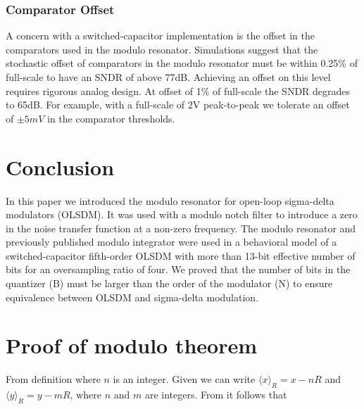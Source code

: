 \subsubsection{Comparator Offset}
 A concern with a switched-capacitor implementation is the offset in
 the comparators used in the modulo resonator. Simulations suggest
 that the stochastic offset of comparators in the modulo resonator
 must be within 0.25\% of full-scale to have an SNDR of
 above 77dB. Achieving an offset on this level requires rigorous analog
 design. At offset of 1\% of full-scale the SNDR degrades
 to 65dB. For example, with a full-scale of 2V peak-to-peak we tolerate
 an offset of $\pm 5mV$ in the comparator thresholds.





\section{Conclusion}
In this paper we introduced the modulo resonator for open-loop
sigma-delta modulators (OLSDM). It was used with a modulo notch filter to
introduce a zero in the noise transfer function at a non-zero
frequency. The modulo resonator and previously published modulo
integrator were used in a behavioral model of a switched-capacitor fifth-order OLSDM with more
than 13-bit effective number of bits for an oversampling ratio of
four. We proved that the number of bits in the quantizer (B) must be
larger than the order of the modulator (N) to ensure equivalence between OLSDM and sigma-delta
modulation.


\myappendices

\section{Proof  of  modulo theorem}
\label{sdrap:modproof}
\begin{IEEEproof}
From definition 
where $n$ is an integer. Given
we can write $\langle x \rangle_R = x-nR$ and $\langle y \rangle_R = y
- mR$, where $n$ and $m$ are integers. From  it follows that
\end{IEEEproof}


